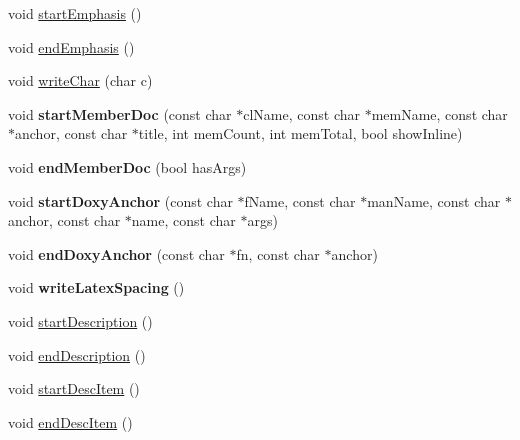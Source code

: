 \begin{DoxyCompactItemize}
\item 
void \mbox{\hyperlink{class_output_list_aba5576798309803175cefaedf33b2a28}{start\+Emphasis}} ()
\item 
void \mbox{\hyperlink{class_output_list_a5674d5d9336eb1f7f6cb83c058f5ad8f}{end\+Emphasis}} ()
\item 
void \mbox{\hyperlink{class_output_list_a188c7a8f0a0dc35ec5ea0f8b4a491d33}{write\+Char}} (char c)
\item 
\mbox{\label{class_output_list_ab658dbf62b1949f902df3b6e7adc5ef5}} 
void {\bfseries start\+Member\+Doc} (const char $\ast$cl\+Name, const char $\ast$mem\+Name, const char $\ast$anchor, const char $\ast$title, int mem\+Count, int mem\+Total, bool show\+Inline)
\item 
\mbox{\label{class_output_list_a1fb2fb5d619d66c8653e05a46a18ef48}} 
void {\bfseries end\+Member\+Doc} (bool has\+Args)
\item 
\mbox{\label{class_output_list_a7a14e324373ca03a31ec00a0864a9d42}} 
void {\bfseries start\+Doxy\+Anchor} (const char $\ast$f\+Name, const char $\ast$man\+Name, const char $\ast$anchor, const char $\ast$name, const char $\ast$args)
\item 
\mbox{\label{class_output_list_a70b9ce86176b7af95072c01f9027aeb1}} 
void {\bfseries end\+Doxy\+Anchor} (const char $\ast$fn, const char $\ast$anchor)
\item 
\mbox{\label{class_output_list_a2a7a1bca5871c912848bddde9b7dd3fc}} 
void {\bfseries write\+Latex\+Spacing} ()
\item 
void \mbox{\hyperlink{class_output_list_a63dfb00b7d99d58acfb89473ab8ac7d8}{start\+Description}} ()
\item 
void \mbox{\hyperlink{class_output_list_a231f2150bf8b3d9823cb1f201ecc6774}{end\+Description}} ()
\item 
void \mbox{\hyperlink{class_output_list_a021752b31f2577c15d6cef3e858c84d8}{start\+Desc\+Item}} ()
\item 
void \mbox{\hyperlink{class_output_list_aca7c1dd564ed727ce77f9f2bc43a74ea}{end\+Desc\+Item}} ()
\item 
\mbox{\label{class_output_list_a8ac4a6e52094643a093fcdeedf1ae0bc}} 

\end{DoxyCompactItemize}
